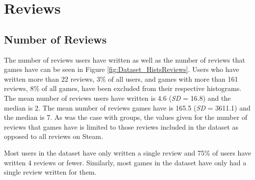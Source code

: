 \section{Reviews} \label{sec:Dataset_Reviews}

\subsection{Number of Reviews}

The number of reviews users have written as well as the number of reviews that games have can be seen in Figure \ref{fig:Dataset_HistsReviews}. Users who have written more than 22 reviews, 3\% of all users, and games with more than 161 reviews, 8\% of all games, have been excluded from their respective histograms. The mean number of reviews users have written is 4.6 (\textit{SD} = 16.8) and the median is 2. The mean number of reviews games have is 165.5 (\textit{SD} = 3611.1) and the median is 7. As was the case with groups, the values given for the number of reviews that games have is limited to those reviews included in the dataset as opposed to all reviews on Steam.

Most users in the dataset have only written a single review and 75\% of users have written 4 reviews or fewer. Similarly, most games in the dataset have only had a single review written for them.

